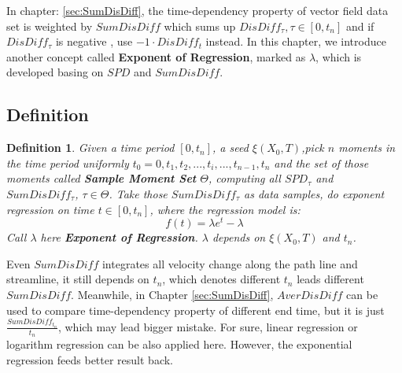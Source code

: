\documentclass[
     11pt,         %
     a4paper,      %
     oneside,
     ]{article}
\newtheorem{mydef}{Definition}
\begin{document}
In chapter: \ref{sec:SumDisDiff}, the time-dependency property of vector field data set is weighted by $SumDisDiff$ which sums up $DisDiff_{\tau}, \tau\in[0,t_{n}]$ and if $DisDiff_{\tau}$ is negative , use $-1\cdot DisDiff_{t}$ instead. In this chapter,  we introduce another concept called \textbf{Exponent of Regression}, marked as $\lambda$, which is developed basing on $SPD$ and $SumDisDiff$.
\subsection{Definition}
\begin{mydef}\label{Def:Exponent}
	Given a time period $[0,t_{n}]$, a seed $\xi(X_{0},T)$,pick $n$ moments in the time period uniformly $t_{0}=0,t_{1},t_{2},...,t_{i},...,t_{n-1},t_{n}$ and the set of those moments called \textbf{Sample Moment Set} $\Theta$, computing all $SPD_{\tau}$ and $SumDisDiff_{\tau}$, $\tau\in\Theta$. Take those $SumDisDiff_{\tau}$ as data samples, do exponent regression on time $t\in[0, t_{n}]$, where the regression model is:
	$$f(t)=\lambda e^{t}-\lambda$$
	Call $\lambda$ here \textbf{Exponent of Regression}.  $\lambda$ depends on $\xi(X_{0},T)$ and $t_{n}$.
\end{mydef}

Even $SumDisDiff$ integrates all velocity change along the path line and streamline, it still depends on $t_{n}$, which denotes different $t_{n}$ leads different $SumDisDiff$. Meanwhile, in Chapter \ref{sec:SumDisDiff}, $AverDisDiff$ can be used to compare time-dependency property of different end time, but it is just $\frac{SumDisDiff_{t_{n}}}{t_{n}}$, which may lead bigger mistake. For sure, linear regression or logarithm regression can be also applied here. However, the exponential regression feeds better result back.\\
\end{document}
